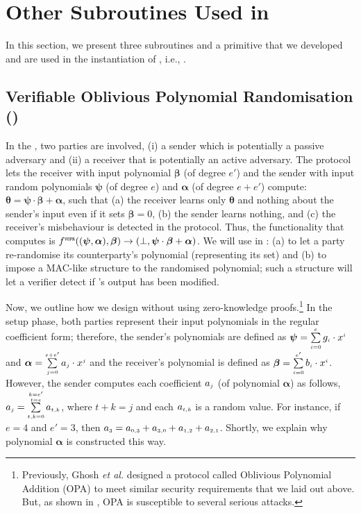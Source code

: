 



\vs
\vs
\vs

\section{Other Subroutines Used in \withFai}\label{sec::subroutines}
\svs
In this section, we present three subroutines and a primitive that we developed and are used in the instantiation of \p, i.e., \withFai. 

\vs
\vs


\subsection{Verifiable Oblivious Polynomial Randomisation (\vopr)}
\svs


In the \vopr, two parties are involved, (i) a sender which is potentially a passive adversary and (ii) a receiver that is potentially an active adversary. The protocol lets the receiver with input polynomial $\bm\beta$ (of degree $e'$) and the sender with input random polynomials $\bm\psi$ (of degree $e$) and  $\bm{\alpha}$ (of degree $e+e'$) compute: $\bm\theta=\bm\psi\cdot \bm\beta+\bm\alpha$, such that (a) the receiver learns only $\bm\theta$ and nothing about the sender's input even if it sets $\bm \beta=0$, (b) the sender learns nothing, and (c) the receiver's misbehaviour is detected in the protocol. Thus, the functionality that  \vopr computes is $f^{\scriptscriptstyle {\ensuremath{\mathtt{VOPR}}}}( (\bm\psi, \bm{\alpha}), \bm\beta)\rightarrow(\bot, \bm\psi\cdot \bm\beta+\bm\alpha)$. 
%
We will use {\vopr} in \withFai:  (a) to let a party re-randomise its counterparty's polynomial (representing its set) and (b) to impose a MAC-like structure to the randomised polynomial; such a structure will let a verifier detect if \vopr's output has been modified. 

Now, we outline how we design \vopr without using zero-knowledge proofs.\footnote{Previously, Ghosh \textit{et al.}  \cite{GhoshN19} designed a protocol called Oblivious Polynomial Addition (OPA) to meet similar security requirements that we laid out above. But, as shown in \cite{AbadiMZ21}, OPA  is susceptible to several serious attacks. } In the setup phase, both parties represent their input polynomials in the regular coefficient form; therefore, the sender's polynomials are defined as $\bm\psi=\sum\limits^{\scriptscriptstyle e}_{\scriptscriptstyle i=0}g_{\scriptscriptstyle i}\cdot x^{\scriptscriptstyle i}$ and  $\bm\alpha=\sum\limits^{\scriptscriptstyle e+e'}_{\scriptscriptstyle j=0}a_{\scriptscriptstyle j}\cdot x^{\scriptscriptstyle j}$ and the receiver's polynomial is defined as $\bm\beta=\sum\limits^{\scriptscriptstyle e'}_{\scriptscriptstyle i=0}b_{\scriptscriptstyle i}\cdot x^{\scriptscriptstyle i}$. However, the sender computes each coefficient $a_{\scriptscriptstyle j}$ (of polynomial $\bm \alpha$) as follows,  $a_{\scriptscriptstyle j}=\sum\limits^{\substack{\scriptscriptstyle k=e'\\ \scriptscriptstyle t=e}}_{\scriptscriptstyle t,k=0} a_{\scriptscriptstyle t,k}$,  where  $t+k=j$ and each $a_{\scriptscriptstyle t,k}$ is a random value. For instance, if $e=4$ and $e'=3$, then $a_{\scriptscriptstyle 3}=a_{\scriptscriptstyle \scriptscriptstyle 0,3}+a_{\scriptscriptstyle 3,0}+a_{\scriptscriptstyle 1,2}+a_{\scriptscriptstyle 2,1}$. Shortly, we explain why polynomial $\bm\alpha$ is constructed this way. 



